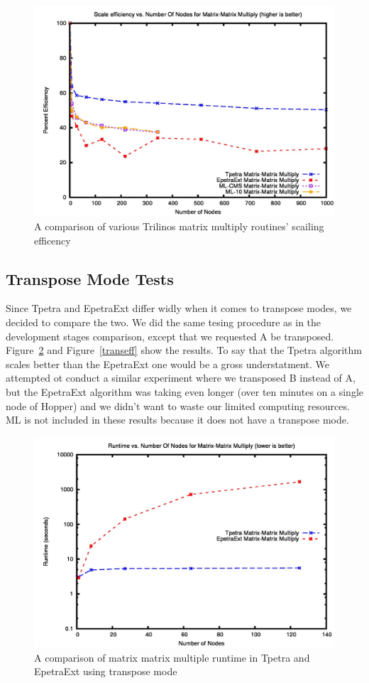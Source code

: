 \documentclass{article}
\begin{document}
\begin{figure}
\includegraphics[scale=.4]{totaleff.jpg}
\caption[Effciency Comparison]{A comparison of various Trilinos matrix multiply routines' scailing efficency}
\label{totaleff}
\end{figure}

\subsection{Transpose Mode Tests}
Since Tpetra and EpetraExt differ widly when it comes to transpose modes, we decided to compare the two. We did the same
tesing procedure as in the development stages comparison, except that we requested A be transposed. Figure~\ref{transtime}
and Figure~\ref{transeff} show the results. To say that the Tpetra
algorithm scales better than the EpetraExt one would be a gross understatment. We attempted ot conduct a similar 
experiment where we transposed B instead of A, but the EpetraExt algorithm was taking even longer (over ten minutes on a 
single node of Hopper) and we didn't want to waste our limited computing resources. ML is not included in these results
because it does not have a transpose mode.

\begin{figure}
\includegraphics[scale=.4]{atranstime.jpg}
\caption[Time Comparison]{A comparison of matrix matrix multiple runtime in Tpetra and EpetraExt using transpose mode}
\label{transtime}
\end{figure}
\end{document}

